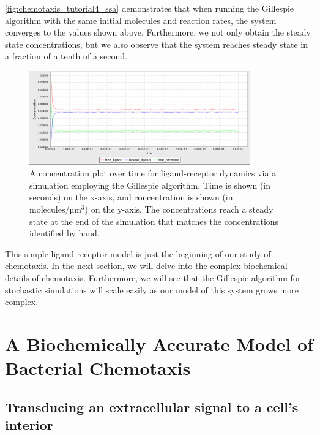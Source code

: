 \autoref{fig:chemotaxis_tutorial4_ssa} demonstrates that when running the Gillespie algorithm with the same initial molecules and reaction rates, the system converges to the values shown above. Furthermore, we not only obtain the steady state concentrations, but we also observe that the system reaches steady state in a fraction of a tenth of a second.\\

\begin{figure}[h]
\centering
\mySfFamily
\includegraphics[width = 0.85\textwidth]{../images/chemotaxis_tutorial4_ssa.png}
\caption{A concentration plot over time for ligand-receptor dynamics via a simulation employing the Gillespie algorithm. Time is shown (in seconds) on the x-axis, and concentration is shown (in $\text{molecules}/\text{µm}^\text{3}$) on the y-axis. The concentrations reach a steady state at the end of the simulation that matches the concentrations identified by hand.}
\label{fig:chemotaxis_tutorial4_ssa}
\end{figure}

This simple ligand-receptor model is just the beginning of our study of chemotaxis. In the next section, we will delve into the complex biochemical details of chemotaxis. Furthermore, we will see that the Gillespie algorithm for stochastic simulations will scale easily as our model of this system grows more complex.\\

\FloatBarrier
{}

\section{A Biochemically Accurate Model of Bacterial Chemotaxis}
\label{sec:a_biochemically_accurate_model_of_bacterial_chemotaxis}

\subsection{Transducing an extracellular signal to a cell's interior}

